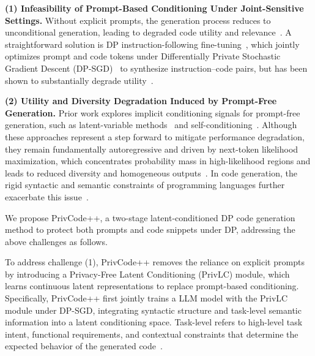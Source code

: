 \documentclass{article}
\theoremstyle{plain}
\theoremstyle{definition}
\theoremstyle{remark}
\def \toolname{PrivCode++}
\begin{document}
 


\noindent \textbf{(1) Infeasibility of Prompt-Based Conditioning Under Joint-Sensitive Settings.} Without explicit prompts, the generation process reduces to unconditional generation, leading to degraded code utility and relevance~\cite{chen2021evaluating}. A straightforward solution is DP instruction-following fine-tuning~\cite{DBLP:journals/corr/abs-2407-07737}, which jointly optimizes prompt and code tokens under Differentially Private Stochastic Gradient
Descent (DP-SGD)~\cite{dpsgd} to synthesize instruction–code pairs, but has been shown to substantially degrade utility~\cite{DBLP:conf/iclr/HongWZL0W24}.



\noindent \textbf{(2) Utility and Diversity Degradation Induced by Prompt-Free Generation.}  Prior work explores implicit conditioning signals for prompt-free generation, such as latent-variable methods~\cite{bowman2016generating} and self-conditioning~\cite{cuadros2022self}. Although these approaches represent a step forward to mitigate performance degradation, they remain fundamentally autoregressive and driven by next-token likelihood maximization, which concentrates probability mass in high-likelihood regions and leads to reduced diversity and homogeneous outputs~\cite{holtzman2019curious}.
In code generation, the rigid syntactic and semantic constraints of programming languages further exacerbate this issue~\cite{zan2023large}.











We propose \toolname, a two-stage latent-conditioned DP code generation method to protect both prompts and code snippets under DP, addressing the above challenges as follows.

To address challenge (1), \toolname{} removes the reliance on explicit prompts by introducing a Privacy-Free Latent Conditioning (PrivLC) module, which learns continuous latent representations to replace prompt-based conditioning. Specifically, \toolname{} first jointly trains a LLM model with the PrivLC module under DP-SGD, integrating syntactic structure and task-level semantic information into a latent conditioning space. Task-level refers to high-level task intent, functional requirements, and contextual constraints that determine the expected behavior of the generated code~\cite{wang2023self}. 
\end{document}
